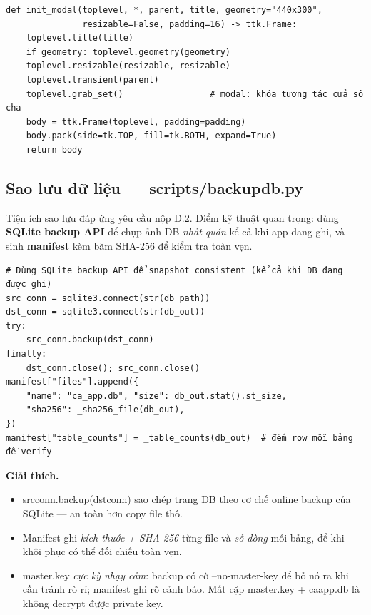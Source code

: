\documentclass[12pt,a4paper]{article}
\newcommand{\code}[1]{{\ttfamily\small\def\_{\textunderscore\discretionary{}{}{}}#1}}
\begin{document}
\begin{Verbatim}
def init_modal(toplevel, *, parent, title, geometry="440x300",
               resizable=False, padding=16) -> ttk.Frame:
    toplevel.title(title)
    if geometry: toplevel.geometry(geometry)
    toplevel.resizable(resizable, resizable)
    toplevel.transient(parent)
    toplevel.grab_set()                 # modal: khóa tương tác cửa sổ cha
    body = ttk.Frame(toplevel, padding=padding)
    body.pack(side=tk.TOP, fill=tk.BOTH, expand=True)
    return body
\end{Verbatim}

\subsection{Sao lưu dữ liệu — \code{scripts/backup\_db.py}}

Tiện ích sao lưu đáp ứng yêu cầu nộp D.2. Điểm kỹ thuật quan trọng: dùng
\textbf{SQLite backup API} để chụp ảnh DB \emph{nhất quán} kể cả khi app đang ghi,
và sinh \textbf{manifest} kèm băm SHA-256 để kiểm tra toàn vẹn.

\begin{Verbatim}
# Dùng SQLite backup API để snapshot consistent (kể cả khi DB đang được ghi)
src_conn = sqlite3.connect(str(db_path))
dst_conn = sqlite3.connect(str(db_out))
try:
    src_conn.backup(dst_conn)
finally:
    dst_conn.close(); src_conn.close()
manifest["files"].append({
    "name": "ca_app.db", "size": db_out.stat().st_size,
    "sha256": _sha256_file(db_out),
})
manifest["table_counts"] = _table_counts(db_out)  # đếm row mỗi bảng để verify
\end{Verbatim}

\textbf{Giải thích.}
\begin{itemize}
  \item \code{src\_conn.backup(dst\_conn)} sao chép trang DB theo cơ chế online
        backup của SQLite — an toàn hơn copy file thô.
  \item Manifest ghi \emph{kích thước + SHA-256} từng file và \emph{số dòng} mỗi
        bảng, để khi khôi phục có thể đối chiếu toàn vẹn.
  \item \code{master.key} \emph{cực kỳ nhạy cảm}: backup có cờ
        \code{--no-master-key} để bỏ nó ra khi cần tránh rò rỉ; manifest ghi rõ
        cảnh báo. Mất cặp \code{master.key} + \code{ca\_app.db} là không decrypt
        được private key.
\end{itemize}

\end{document}
